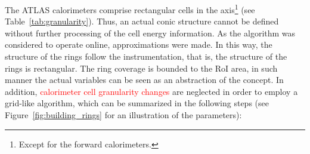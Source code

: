 The ATLAS calorimeters comprise rectangular cells in the
\etaphi axis\footnote{Except for the forward calorimeters.} (see
Table~\ref{tab:granularity}). Thus, an actual conic structure cannot be defined
without further processing of the cell energy information. As the algorithm was
considered to operate online, approximations were made. In this way, the
structure of the rings follow the instrumentation, that is, the structure of
the rings is rectangular. The ring coverage is bounded to the RoI area, in
such manner the actual variables can be seen as an abstraction of the concept.
In addition, \textcolor{red}{calorimeter cell granularity changes} are neglected in order to employ a
grid-like algorithm, which can be summarized in the following steps (see
Figure~\ref{fig:building_rings} for an illustration of the parameters):




